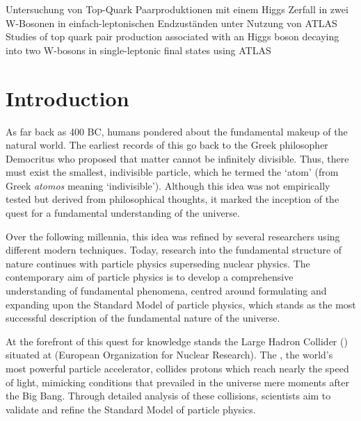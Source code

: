 \documentclass[bachelor,ngerman,english]{GAUBM}
\begin{document}
	
\ThesisTitle%
    {Untersuchung von Top-Quark Paarproduktionen mit einem Higgs Zerfall in zwei W-Bosonen in einfach-leptonischen Endzuständen unter Nutzung von ATLAS}%
    {Studies of top quark pair production associated with an Higgs boson decaying into two W-bosons in single-leptonic final states using ATLAS}

\frontmatter
\maketitle
\cleardoublepage
\onehalfspacing
\tableofcontents
\mainmatter


\chapter{Introduction}
\label{ch:introduction}
As far back as 400 BC, humans pondered about the fundamental makeup of the natural world. The earliest records of this go back to the Greek philosopher Democritus who proposed that matter cannot be infinitely divisible. Thus, there must exist the smallest, indivisible particle, which he termed the `atom' (from Greek \textit{atomos} meaning `indivisible'). Although this idea was not empirically tested but derived from philosophical thoughts, it marked the inception of the quest for a fundamental understanding of the universe.

Over the following millennia, this idea was refined by several researchers using different modern techniques. Today, research into the fundamental structure of nature continues with particle physics superseding nuclear physics. The contemporary aim of particle physics is to develop a comprehensive understanding of fundamental phenomena, centred around formulating and expanding upon the Standard Model of particle physics, which stands as the most successful description of the fundamental nature of the universe.

At the forefront of this quest for knowledge stands the Large Hadron Collider (\lhc) situated at \cern (European Organization for Nuclear Research). The \lhc, the world's most powerful particle accelerator, collides protons which reach nearly the speed of light, mimicking conditions that prevailed in the universe mere moments after the Big Bang. Through detailed analysis of these collisions, scientists aim to validate and refine the Standard Model of particle physics. 
\end{document}
